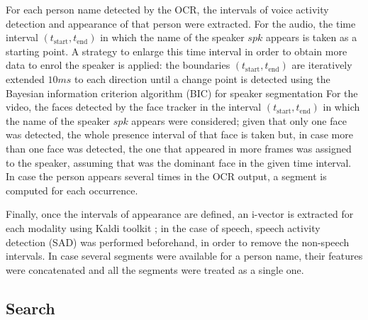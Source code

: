 For each person name detected by the OCR, the intervals of voice activity detection and appearance of that person were extracted. For the audio, 
the time interval $(t_{\mathrm{start}},t_{\mathrm{end}})$ in which the name of the speaker $spk$ appears is taken as a starting point. A strategy to enlarge this time
 interval in order to obtain more data to enrol the speaker is applied: the boundaries $(t_{\mathrm{start}},t_{\mathrm{end}})$ are iteratively extended $10ms$ to each direction until a change point is detected using the Bayesian information criterion algorithm
 (BIC) for speaker segmentation
%
% 
For the video, the faces detected by the face tracker in the interval $(t_{\mathrm{start}},t_{\mathrm{end}})$ in 
 which the name of the speaker $spk$ appears were considered; given that only one face was detected, the whole presence interval of that face is taken but, in case more than 
 one face was detected, the one that appeared in more frames was assigned to the speaker, assuming that was the dominant face in the given time interval.
 In case the person appears several times in the OCR output, a segment is computed for each occurrence.
 
 Finally, once the intervals of appearance are defined, an i-vector \cite{dehak10} is extracted for each modality using Kaldi toolkit \cite{kaldi}; in the case of speech, speech activity detection (SAD) was performed
 beforehand, in order to remove the non-speech intervals. In case several segments were available for a person name, their features were concatenated and all the segments
 were treated as a single one.

\subsection{Search}

